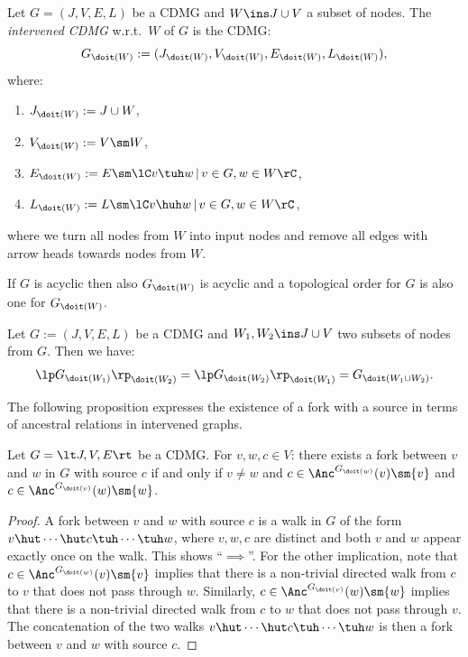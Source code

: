\begin{Def}\label{def:G_hard_intervention}
    Let $G=(J,V,E,L)$ be a CDMG and $W \ins J \cup V$ a subset of nodes.
  The \emph{intervened CDMG} w.r.t.\ $W$ of $G$ is the CDMG: 
  \[ G_{\doit(W)}:=(J_{\doit(W)},V_{\doit(W)},E_{\doit(W)},L_{\doit(W)}),\] 
  where:
  \begin{enumerate}[label=\roman*.)]
      \item $J_{\doit(W)}:= J \cup W$,
      \item $V_{\doit(W)}:= V \sm W$,
      \item $E_{\doit(W)}:= E \sm \lC v \tuh w \,|\, v \in G, w  \in W  \rC$,
      \item $L_{\doit(W)}:= L \sm \lC v \huh w\,|\, v \in G, w \in W \rC$,
  \end{enumerate}
  where we turn all nodes from $W$ into input nodes and remove all edges with arrow heads towards nodes from $W$.
\end{Def}

\begin{Rem}
    If $G$ is acyclic then also $G_{\doit(W)}$ is acyclic and a topological order for $G$ is also one for $G_{\doit(W)}$.
\end{Rem}

\begin{Lem}\label{hard-interventions-commute}
    Let $G:=(J,V,E,L)$ be a CDMG and $W_1, W_2 \ins J \cup V$ two  subsets of nodes from $G$. 
      Then we have:
      \[ \lp G_{\doit(W_1)} \rp_{\doit(W_2)} = \lp G_{\doit(W_2)} \rp_{\doit(W_1)} =  G_{\doit(W_1 \cup W_2)}. \]
\end{Lem}

The following proposition expresses the existence of a fork with a source in terms of ancestral relations in intervened graphs.
\begin{Prp}\label{prp:forks_alternative}
  Let $G = \lt J, V, E \rt$ be a CDMG. For $v, w, c \in V$:
  there exists a fork between $v$ and $w$ in $G$ with source $c$ if and only if $v \ne w$ and $c \in \Anc^{G_{\doit(w)}}(v) \sm \{v\}$ and $c \in \Anc^{G_{\doit(v)}}(w) \sm \{w\}$.
\end{Prp}
\begin{proof}
  A fork between $v$ and $w$ with source $c$ is a walk in $G$ of the form $v \hut \cdots \hut c \tuh \cdots \tuh w$, where $v,w,c$ are distinct and both $v$ and $w$ appear exactly once on the walk.
  This shows ``$\implies$''. For the other implication, note that $c \in \Anc^{G_{\doit(w)}}(v) \sm \{v\}$ implies that there is a non-trivial directed walk from $c$ to $v$ that does not pass through $w$. 
  Similarly, $c \in \Anc^{G_{\doit(v)}}(w) \sm \{w\}$ implies that there is a non-trivial directed walk from $c$ to $w$ that does not pass through $v$. 
  The concatenation of the two walks $v \hut \cdots \hut c \tuh \cdots \tuh w$ is then a fork between $v$ and $w$ with source $c$.
\end{proof}

